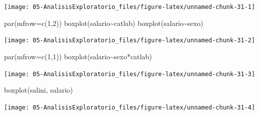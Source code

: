 \documentclass[
]{book}
\newenvironment{Shaded}{\begin{snugshade}}{\end{snugshade}}
\newcommand{\AttributeTok}[1]{\textcolor[rgb]{0.77,0.63,0.00}{#1}}
\newcommand{\DecValTok}[1]{\textcolor[rgb]{0.00,0.00,0.81}{#1}}
\newcommand{\FunctionTok}[1]{\textcolor[rgb]{0.00,0.00,0.00}{#1}}
\newcommand{\NormalTok}[1]{#1}
\newcommand{\SpecialCharTok}[1]{\textcolor[rgb]{0.00,0.00,0.00}{#1}}
\theoremstyle{break}
\theoremstyle{nonumberplain}
\begin{document}
\begin{center}\texttt{[image: 05-AnalisisExploratorio\_files/figure-latex/unnamed-chunk-31-1]} \end{center}

\begin{Shaded}
\begin{Highlighting}[]
\FunctionTok{par}\NormalTok{(}\AttributeTok{mfrow=}\FunctionTok{c}\NormalTok{(}\DecValTok{1}\NormalTok{,}\DecValTok{2}\NormalTok{))}
\FunctionTok{boxplot}\NormalTok{(salario}\SpecialCharTok{\textasciitilde{}}\NormalTok{catlab)}
\FunctionTok{boxplot}\NormalTok{(salario}\SpecialCharTok{\textasciitilde{}}\NormalTok{sexo)}
\end{Highlighting}
\end{Shaded}

\begin{center}\texttt{[image: 05-AnalisisExploratorio\_files/figure-latex/unnamed-chunk-31-2]} \end{center}

\begin{Shaded}
\begin{Highlighting}[]
\FunctionTok{par}\NormalTok{(}\AttributeTok{mfrow=}\FunctionTok{c}\NormalTok{(}\DecValTok{1}\NormalTok{,}\DecValTok{1}\NormalTok{))}
\FunctionTok{boxplot}\NormalTok{(salario}\SpecialCharTok{\textasciitilde{}}\NormalTok{sexo}\SpecialCharTok{*}\NormalTok{catlab)}
\end{Highlighting}
\end{Shaded}

\begin{center}\texttt{[image: 05-AnalisisExploratorio\_files/figure-latex/unnamed-chunk-31-3]} \end{center}

\begin{Shaded}
\begin{Highlighting}[]
\FunctionTok{boxplot}\NormalTok{(salini, salario)}
\end{Highlighting}
\end{Shaded}

\begin{center}\texttt{[image: 05-AnalisisExploratorio\_files/figure-latex/unnamed-chunk-31-4]} \end{center}
\end{document}
